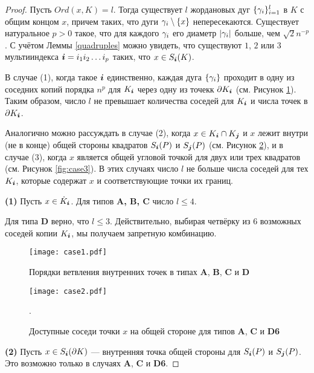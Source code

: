 \begin{proof}\label{proof:point_branching}
Пусть $Ord(x,K)=l$.
Тогда существует $l$ жордановых дуг $\{\gamma_i\}_{i=1}^l$ в $K$ с общим концом $x$, причем таких, что дуги $\gamma_i\setminus \{x\}$ непересекаются.
Существует натуральное $p>0$ такое, что для каждого $\gamma_i$ его диаметр $|\gamma_i|$ больше, чем $\sqrt{2}n^{-p}$.
С учётом Леммы \ref{quadruples} можно увидеть, что существуют $1$, $2$ или $3$ мультииндекса ${\bm{i}}=i_1i_2\ldots i_p$ таких, что $x\in S_{\bm{i}}(K)$.

В случае (1), когда такое ${\bm{i}}$ единственно, каждая дуга $\{\gamma_i\}$ проходит в одну из соседних копий порядка $n^p$ для $K_{\bm{i}}$ через одну из точекк $\partial K_{\bm{i}}$ (см. Рисунок \ref{fig:case1}). 
Таким образом, число $l$ не превышает количества соседей для $K_{\bm{i}}$  и числа точек в $\partial K_{\bm{i}}$. 

Аналогично можно рассуждать в случае (2), когда $x\in K_{\bm{i}}\cap K_{\bm{j}}$ и $x$ лежит внутри (не в конце) общей стороны квадратов $S_{\bm{i}}(P)$ и $S_{\bm{j}}(P)$ (см. Рисунок \ref{fig:case2}), и в случае (3), когда $x$ является общей угловой точкой для двух или трех квадратов (см. Рисунок \ref{fig:case3}). 
В этих случаях число $l$ не больше числа соседей для тех $K_{\bm{i}}$, которые содержат $x$ и соответствующие точки их границ.

\textbf{(1)}
Пусть $x\in \dot K_{\bm{i}}$.
Для типов {\bf A, B, C} число $l\leq 4$.

Для типа {\bf D} верно, что $l\le 3$. 
Действительно, выбирая четвёрку из $6$ возможных соседей копии $K_{\bm{i}}$, мы получаем запретную комбинацию. 
\begin{figure}[H]
    \centering
    \texttt{[image: case1.pdf]}
    \caption{Порядки ветвления внутренних точек в типах \textbf{A}, \textbf{B}, \textbf{C} и \textbf{D}}
    \label{fig:case1}
\end{figure}

\begin{figure}[H]
    \centering
    \texttt{[image: case2.pdf]}
    \caption{Доступные соседи точки $x$ на общей стороне для типов \textbf{A}, \textbf{C} и \textbf{D6}}. 
    \label{fig:case2}
\end{figure}


\textbf{(2)}
Пусть $x\in S_{\bm{i}}(\partial K)$ --- внутренняя точка общей стороны для $S_{\bm{i}}(P)$ и $S_{\bm{j}}(P)$.
Это возможно только в случаях \textbf{A}, \textbf{C} и \textbf{D6}.


\end{proof}

